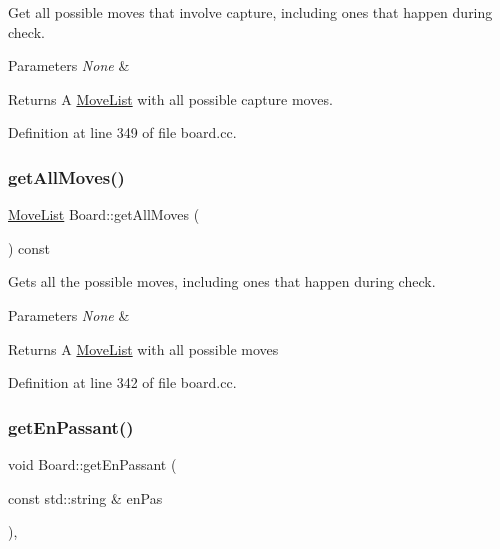 Get all possible moves that involve capture, including ones that happen during check. 


\begin{DoxyParams}{Parameters}
{\em None} & \\
\hline
\end{DoxyParams}
\begin{DoxyReturn}{Returns}
A \mbox{\hyperlink{classMoveList}{Move\+List}} with all possible capture moves. 
\end{DoxyReturn}


Definition at line 349 of file board.\+cc.

\mbox{\label{classBoard_a515095fc28f6aa8057296914156b09cb}} 
\subsubsection{\texorpdfstring{get\+All\+Moves()}{getAllMoves()}}
{\footnotesize\ttfamily \mbox{\hyperlink{classMoveList}{Move\+List}} Board\+::get\+All\+Moves (\begin{DoxyParamCaption}{ }\end{DoxyParamCaption}) const\hspace{0.3cm}{\ttfamily [noexcept]}}



Gets all the possible moves, including ones that happen during check. 


\begin{DoxyParams}{Parameters}
{\em None} & \\
\hline
\end{DoxyParams}
\begin{DoxyReturn}{Returns}
A \mbox{\hyperlink{classMoveList}{Move\+List}} with all possible moves 
\end{DoxyReturn}


Definition at line 342 of file board.\+cc.

\mbox{\label{classBoard_a9e6c964048b76b8f93c583383efe80ac}} 
\subsubsection{\texorpdfstring{get\+En\+Passant()}{getEnPassant()}}
{\footnotesize\ttfamily void Board\+::get\+En\+Passant (\begin{DoxyParamCaption}\item[{const std\+::string \&}]{en\+Pas }\end{DoxyParamCaption})\hspace{0.3cm}{\ttfamily [private]}, {\ttfamily [noexcept]}}



